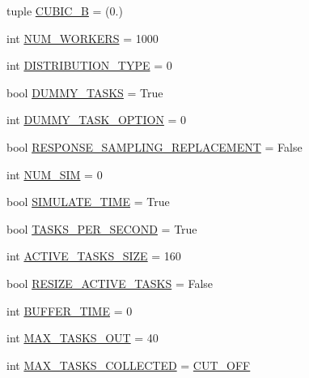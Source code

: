 \begin{DoxyCompactItemize}
tuple \mbox{\hyperlink{namespacedynamicfilterapp_1_1toggles_a2d4f2e30d34616c754114da7b5c88000}{C\+U\+B\+I\+C\+\_\+B}} = (0.)
\item 
int \mbox{\hyperlink{namespacedynamicfilterapp_1_1toggles_a806fc12166c09fa5baabfcbe218040ae}{N\+U\+M\+\_\+\+W\+O\+R\+K\+E\+RS}} = 1000
\item 
int \mbox{\hyperlink{namespacedynamicfilterapp_1_1toggles_aceed21fa0675802d2f756c7da43cb049}{D\+I\+S\+T\+R\+I\+B\+U\+T\+I\+O\+N\+\_\+\+T\+Y\+PE}} = 0
\item 
bool \mbox{\hyperlink{namespacedynamicfilterapp_1_1toggles_a16edb4f07d82f0494347a0977663e6f4}{D\+U\+M\+M\+Y\+\_\+\+T\+A\+S\+KS}} = True
\item 
int \mbox{\hyperlink{namespacedynamicfilterapp_1_1toggles_a0b87eab5c4f4f0b986a43805f825d2c6}{D\+U\+M\+M\+Y\+\_\+\+T\+A\+S\+K\+\_\+\+O\+P\+T\+I\+ON}} = 0
\item 
bool \mbox{\hyperlink{namespacedynamicfilterapp_1_1toggles_a1f569cdee80dfd4d7a2d7a3f3aebc47f}{R\+E\+S\+P\+O\+N\+S\+E\+\_\+\+S\+A\+M\+P\+L\+I\+N\+G\+\_\+\+R\+E\+P\+L\+A\+C\+E\+M\+E\+NT}} = False
\item 
int \mbox{\hyperlink{namespacedynamicfilterapp_1_1toggles_a3baf5565851cd87736238d8dddfc1106}{N\+U\+M\+\_\+\+S\+IM}} = 0
\item 
bool \mbox{\hyperlink{namespacedynamicfilterapp_1_1toggles_af689b6dbf6a3a082bbfb9f6decf1a805}{S\+I\+M\+U\+L\+A\+T\+E\+\_\+\+T\+I\+ME}} = True
\item 
bool \mbox{\hyperlink{namespacedynamicfilterapp_1_1toggles_a61ac104de71d68599b307f679baf3ea0}{T\+A\+S\+K\+S\+\_\+\+P\+E\+R\+\_\+\+S\+E\+C\+O\+ND}} = True
\item 
int \mbox{\hyperlink{namespacedynamicfilterapp_1_1toggles_a374727dba0574510b39c1e2871f69e48}{A\+C\+T\+I\+V\+E\+\_\+\+T\+A\+S\+K\+S\+\_\+\+S\+I\+ZE}} = 160
\item 
bool \mbox{\hyperlink{namespacedynamicfilterapp_1_1toggles_ac82a59d01e707324a65d0af9b82c7f59}{R\+E\+S\+I\+Z\+E\+\_\+\+A\+C\+T\+I\+V\+E\+\_\+\+T\+A\+S\+KS}} = False
\item 
int \mbox{\hyperlink{namespacedynamicfilterapp_1_1toggles_a04a9eab148403f1f27d44b38211aad04}{B\+U\+F\+F\+E\+R\+\_\+\+T\+I\+ME}} = 0
\item 
int \mbox{\hyperlink{namespacedynamicfilterapp_1_1toggles_a27cea6b210bbcb9af3fbd7edc3901390}{M\+A\+X\+\_\+\+T\+A\+S\+K\+S\+\_\+\+O\+UT}} = 40
\item 
int \mbox{\hyperlink{namespacedynamicfilterapp_1_1toggles_aa05c90c0672e9b74717bdeabb00fd1bb}{M\+A\+X\+\_\+\+T\+A\+S\+K\+S\+\_\+\+C\+O\+L\+L\+E\+C\+T\+ED}} = \mbox{\hyperlink{namespacedynamicfilterapp_1_1toggles_a914791c176a78c026dc76a18bcd88d73}{C\+U\+T\+\_\+\+O\+FF}}

\end{DoxyCompactItemize}
